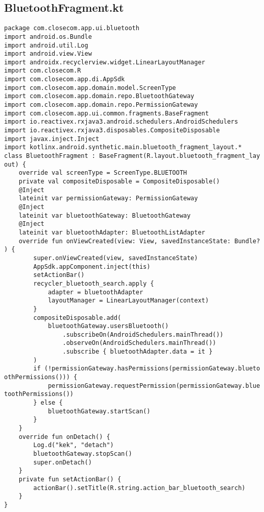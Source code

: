 \documentclass[listing]{espd}
\begin{document}
\subsection{BluetoothFragment.kt}
\begin{verbatim}
package com.closecom.app.ui.bluetooth
import android.os.Bundle
import android.util.Log
import android.view.View
import androidx.recyclerview.widget.LinearLayoutManager
import com.closecom.R
import com.closecom.app.di.AppSdk
import com.closecom.app.domain.model.ScreenType
import com.closecom.app.domain.repo.BluetoothGateway
import com.closecom.app.domain.repo.PermissionGateway
import com.closecom.app.ui.common.fragments.BaseFragment
import io.reactivex.rxjava3.android.schedulers.AndroidSchedulers
import io.reactivex.rxjava3.disposables.CompositeDisposable
import javax.inject.Inject
import kotlinx.android.synthetic.main.bluetooth_fragment_layout.*
class BluetoothFragment : BaseFragment(R.layout.bluetooth_fragment_lay
out) {
    override val screenType = ScreenType.BLUETOOTH
    private val compositeDisposable = CompositeDisposable()
    @Inject
    lateinit var permissionGateway: PermissionGateway
    @Inject
    lateinit var bluetoothGateway: BluetoothGateway
    @Inject
    lateinit var bluetoothAdapter: BluetoothListAdapter
    override fun onViewCreated(view: View, savedInstanceState: Bundle?
) {
        super.onViewCreated(view, savedInstanceState)
        AppSdk.appComponent.inject(this)
        setActionBar()
        recycler_bluetooth_search.apply {
            adapter = bluetoothAdapter
            layoutManager = LinearLayoutManager(context)
        }
        compositeDisposable.add(
            bluetoothGateway.usersBluetooth()
                .subscribeOn(AndroidSchedulers.mainThread())
                .observeOn(AndroidSchedulers.mainThread())
                .subscribe { bluetoothAdapter.data = it }
        )
        if (!permissionGateway.hasPermissions(permissionGateway.blueto
othPermissions())) {
            permissionGateway.requestPermission(permissionGateway.blue
toothPermissions())
        } else {
            bluetoothGateway.startScan()
        }
    }
    override fun onDetach() {
        Log.d("kek", "detach")
        bluetoothGateway.stopScan()
        super.onDetach()
    }
    private fun setActionBar() {
        actionBar().setTitle(R.string.action_bar_bluetooth_search)
    }
}
\end{verbatim}
\end{document}
